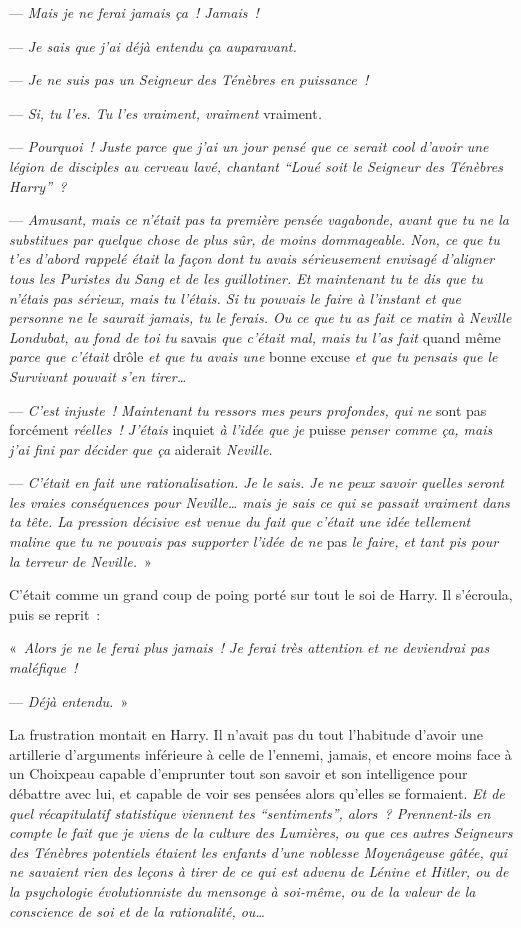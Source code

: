 --- \emph{Mais je ne ferai jamais ça~! Jamais~!}

--- \emph{Je sais que j'ai déjà entendu ça auparavant.}

--- \emph{Je ne suis pas un Seigneur des Ténèbres en puissance~!}

--- \emph{Si, tu l'es. Tu l'es vraiment, vraiment} vraiment\emph{.}

--- \emph{Pourquoi~! Juste parce que j'ai un jour pensé que ce serait cool d'avoir une légion de disciples au cerveau lavé, chantant “Loué soit le Seigneur des Ténèbres Harry”~?}

--- \emph{Amusant, mais ce n'était pas ta première pensée vagabonde, avant que tu ne la substitues par quelque chose de plus sûr, de moins dommageable. Non, ce que tu t'es d'abord rappelé était la façon dont tu avais sérieusement envisagé d'aligner tous les Puristes du Sang et de les guillotiner. Et maintenant tu te dis que tu n'étais pas sérieux, mais tu l'étais. Si tu pouvais le faire à l'instant et que personne ne le saurait jamais, tu le ferais. Ou ce que tu as fait ce matin à Neville Londubat, au fond de toi tu} savais \emph{que c'était mal, mais tu l'as fait} quand même \emph{parce que c'était} drôle \emph{et que tu avais une} bonne excuse \emph{et que tu pensais que le Survivant pouvait s'en tirer…}

--- \emph{C'est injuste~! Maintenant tu ressors mes peurs profondes, qui ne} sont pas forcément \emph{réelles~! J'étais} inquiet \emph{à l'idée que je} puisse \emph{penser comme ça, mais j'ai fini par décider que ça} aiderait \emph{Neville.}

--- \emph{C'était en fait une rationalisation. Je le sais. Je ne peux savoir quelles seront les vraies conséquences pour Neville… mais je sais ce qui se passait vraiment dans ta tête. La pression décisive est venue du fait que c'était une idée tellement maline que tu ne pouvais pas supporter l'idée de ne} pas \emph{le faire, et tant pis pour la terreur de Neville.}~»

C'était comme un grand coup de poing porté sur tout le soi de Harry. Il s'écroula, puis se reprit~:

«~\emph{Alors je ne le ferai plus jamais~! Je ferai très attention et ne deviendrai pas maléfique~!}

--- \emph{Déjà entendu.}~»

La frustration montait en Harry. Il n'avait pas du tout l'habitude d'avoir une artillerie d'arguments inférieure à celle de l'ennemi, jamais, et encore moins face à un Choixpeau capable d'emprunter tout son savoir et son intelligence pour débattre avec lui, et capable de voir ses pensées alors qu'elles se formaient. \emph{Et de quel récapitulatif statistique viennent tes “sentiments”, alors~? Prennent-ils en compte le fait que je viens de la culture des Lumières, ou que ces autres Seigneurs des Ténèbres potentiels étaient les enfants d'une noblesse Moyenâgeuse gâtée, qui ne savaient rien des leçons à tirer de ce qui est advenu de Lénine et Hitler, ou de la psychologie évolutionniste du mensonge à soi-même, ou de la valeur de la conscience de soi et de la rationalité, ou…}

